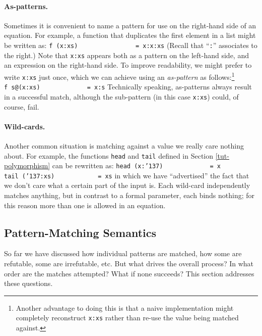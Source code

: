 \paragraph*{As-patterns.} Sometimes it is convenient to name a
pattern for use on the right-hand side of an equation.  For example, a
function that duplicates the first element in a list might be written
as: 
\bprog
\mbox{\tt f\ (x:xs)\ \ \ \ \ \ \ \ \ \ \ \ \ \ \ \ =\ x:x:xs}
\eprog 
(Recall that ``\mbox{\tt :}'' associates to the right.)  Note that \mbox{\tt x:xs} appears
both as a pattern on the left-hand side, and an expression on the
right-hand side.  To improve readability, we might prefer to write
\mbox{\tt x:xs} just once, which we can achieve using an {\em as-pattern} as
follows:\footnote{Another advantage to doing this is that a naive
implementation might completely reconstruct \mbox{\tt x:xs} rather than
re-use the value being matched against.}
\bprog
\mbox{\tt f\ s@(x:xs)\ \ \ \ \ \ \ \ \ \ \ \ \ =\ x:s}
\eprog 
Technically speaking, as-patterns always result in a successful match,
although the sub-pattern (in this case \mbox{\tt x:xs}) could, of course, fail.

\paragraph*{Wild-cards.} Another common situation is matching against
a value we really care nothing about.  For example, the functions
\mbox{\tt head} and \mbox{\tt tail} defined in Section \ref{tut-polymorphism}
can be rewritten as:
\bprog
\mbox{\tt head\ (x:{\char'137})\ \ \ \ \ \ \ \ \ \ \ \ \ =\ x}\\
\mbox{\tt tail\ ({\char'137}:xs)\ \ \ \ \ \ \ \ \ \ \ \ =\ xs}
\eprog 
in which we have ``advertised'' the fact that we don't care what a
certain part of the input is.  Each wild-card independently matches
anything, but in contrast to a formal parameter, each binds
nothing; for this reason more than one is allowed in an equation.



\subsection{Pattern-Matching Semantics}
\label{tut-matching-semantics}

So far we have discussed how individual patterns are matched, how some
are refutable, some are irrefutable, etc.  But what drives the overall
process?  In what order are the matches attempted?  What if none
succeeds?  This section addresses these questions.

